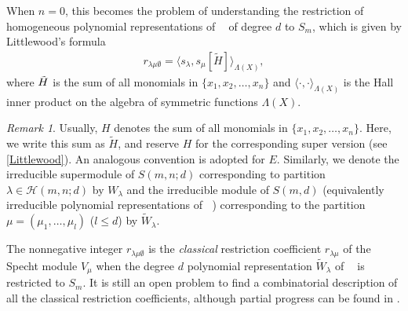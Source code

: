 \documentclass[12pt,reqno]{amsart}
\theoremstyle{definition}
\theoremstyle{remark}
\newtheorem*{remark*}{Remark}
\newcommand{\Hi}{\mathcal{H}(m,n;d)}
\DeclareMathOperator{\glm}{\mathrm{GL_{m}}(\mathbb{C})}
\begin{document}
When $n=0$, this becomes the problem of understanding the restriction of homogeneous polynomial representations of $\glm$ of degree $d$ to $S_m$, which is given by Littlewood's formula ~\cite[Theorem XI]{littlewood1958products}
\begin{align}\label{LittlwoodFormula}
    r_{\lambda\mu\emptyset}=\langle s_{\lambda},s_{\mu}[\tilde H] \rangle_{\Lambda(X)},
\end{align}
where $\Tilde{H}$ is the sum of all monomials in $\{x_{1},x_{2},\dotsc,x_{n}\}$ and $\langle\cdot,\cdot\rangle_{\Lambda(X)}$ is the Hall inner product \cite[Chapter I, Equation 4.5]{macdonald1998symmetric} on the algebra of symmetric functions $\Lambda(X)$.

\begin{remark*}Usually, $H$ denotes the sum of all monomials in $\{x_{1},x_{2},\dotsc,x_{n}\}$. Here, we write this sum as $\tilde{H}$, and reserve $H$ for the corresponding super version (see \eqref{Littlewood}). An analogous convention is adopted for $E$. Similarly, we denote the irreducible supermodule of $S(m,n;d)$ corresponding to partition $\lambda\in\Hi$ by $W_{\lambda}$ and the irreducible module of $S(m,d)$ (equivalently irreducible polynomial representations of $\glm$) corresponding to the partition $\mu=(\mu_{1},\dotsc,\mu_{l})$ ($l\leq d$) by $\tilde{W}_{\lambda}$.
\end{remark*}

The nonnegative integer
$r_{\lambda\mu\emptyset}$ is the \textit{classical} restriction coefficient $r_{\lambda\mu}$ of the Specht module $V_{\mu}$ when the degree $d$ polynomial representation $\tilde{W}_{\lambda}$ of $\glm$ is restricted to $S_{m}$. It is still an open problem to find a combinatorial description of all the classical restriction coefficients, although partial progress can be found in \cite{assaf2020specht,harman2018representations,lee2025restriction,narayanan2021character, narayanan2021polynomial, narayanan2024some,  narayanan2024hook,orellana2021hopf,orellana2021symmetric}.
\end{document}
